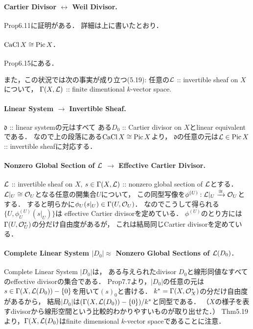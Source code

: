 \documentclass[a4paper]{jsarticle}
\newcommand{\CaCl}{\operatorname{CaCl}}
\newcommand{\Pic}{\operatorname{Pic}}
\newcommand{\lsd}{\mathfrak{d}}
\begin{document}
    \paragraph{Cartier Divisor $\leftrightarrow$ Weil Divisor.}
    Prop6.11に証明がある．
    詳細は上に書いたとおり．

    \paragraph{$\CaCl X \iso \Pic X$.}
    Prop6.15にある．

    また，この状況では次の事実が成り立つ(5.19):
    任意の$\mathcal{L}$ :: invertible sheaf on $X$について，
    $\Gamma(X,\mathcal{L})$ :: finite dimentional $k$-vector space.

    \paragraph{Linear System $\rightarrow$ Invertible Sheaf.}
    $\lsd$ :: linear systemの元はすべて
    ある$D_0$ :: Cartier divisor on $X$とlinear equivalentである．
    なので上の段落にある$\CaCl X \iso \Pic X$より，
    $\lsd$の任意の元は$\shL \in \Pic X$ :: invertible sheafに対応する．

    \paragraph{Nonzero Global Section of $\mathcal{L}$ $\rightarrow$ Effective Cartier Divisor.}
    $\mathcal{L}$ :: invertible sheaf on $X$,
    $s \in \Gamma(X,\mathcal{L})$ :: nonzero global section of $\mathcal{L}$とする．
    $\mathcal{L}|_U \cong \mathcal{O}_U$となる任意の開集合$U$について，
    この同型写像を$\phi^{(U)}: \mathcal{L}|_U \xrightarrow{\cong} \mathcal{O}_U$とする．
    すると明らかに$\phi_U(s|_U) \in \Gamma(U,\mathcal{O}_U)$．
    なのでこうして得られる$\{U, \phi^{(U)}_U(s|_U)\}$は
    effective Cartier divisorを定めている．
    $\phi^{(U)}$のとり方には$\Gamma(U,\mathcal{O}_U^*)$の分だけ自由度があるが，
    これは結局同じCartier divisorを定めている．

    \paragraph{Complete Linear System $|D_0| $$\approx$ Nonzero Global Sections of $\mathcal{L}(D_0)$.}
    Complete Linear System $|D_0|$は，
    ある与えられたdivisor $D_0$と線形同値なすべてのeffective divisorの集合である．
    Prop7.7より，$|D_0|$の任意の元は$s \in \Gamma(X,\mathcal{L}(D_0))-\{0\}$を用いて$(s)_0$と書ける．
    $k^*=\Gamma(X,\mathcal{O}_X^*)$の分だけ自由度があるから，
    結局$|D_0|$は$(\Gamma(X,\mathcal{L}(D_0))-\{0\})/k^*$と同型である．
    （$X$の様子を表すdivisorから線形空間という比較的わかりやすいものが取り出せた．）
    Thm5.19より，$\Gamma(X,\mathcal{L}(D_0)$はfinite dimensional $k$-vector spaceであることに注意．
\end{document}
